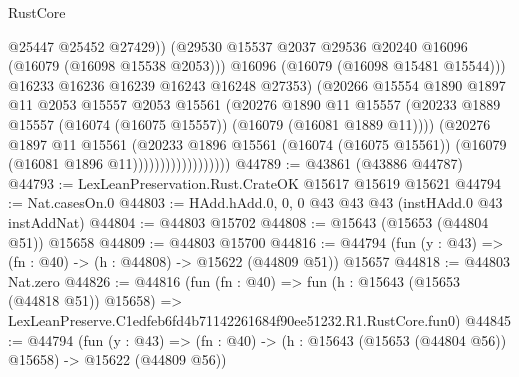 \begin{lexlean}{RustCore}
\begin{coremodule}
                                      @25447
                                      @25452
                                      @27429))
                                  (@29530
                                    @15537
                                    @2037
                                    @29536
                                    @20240
                                    @16096
                                    (@16079 (@16098 @15538 @2053)))
                                  @16096
                                  (@16079 (@16098 @15481 @15544)))
                                @16233
                                @16236
                                @16239
                                @16243
                                @16248
                                @27353)
                              (@20266
                                @15554
                                @1890
                                @1897
                                @11
                                @2053
                                @15557
                                @2053
                                @15561
                                (@20276
                                  @1890
                                  @11
                                  @15557
                                  (@20233
                                    @1889
                                    @15557
                                    (@16074 (@16075 @15557))
                                    (@16079 (@16081 @1889 @11))))
                                (@20276
                                  @1897
                                  @11
                                  @15561
                                  (@20233
                                    @1896
                                    @15561
                                    (@16074 (@16075 @15561))
                                    (@16079 (@16081 @1896 @11))))))))))))))))))
@44789 := @43861 (@43886 @44787)
@44793 := LexLeanPreservation.Rust.CrateOK @15617 @15619 @15621
@44794 := Nat.casesOn.{0}
@44803 := HAdd.hAdd.{0, 0, 0} @43 @43 @43 (instHAdd.{0} @43 instAddNat)
@44804 := @44803 @15702
@44808 := @15643 (@15653 (@44804 @51)) @15658
@44809 := @44803 @15700
@44816 := @44794 (fun (y : @43) => (fn : @40) -> (h : @44808) -> @15622 (@44809 @51)) @15657
@44818 := @44803 Nat.zero
@44826 := @44816
    (fun (fn : @40) =>
    fun (h : @15643 (@15653 (@44818 @51)) @15658) =>
    LexLeanPreserve.C1edfeb6fd4b71142261684f90ee51232.R1.RustCore.fun0)
@44845 := @44794
    (fun (y : @43) =>
    (fn : @40) -> (h : @15643 (@15653 (@44804 @56)) @15658) -> @15622 (@44809 @56))

\end{coremodule}
\end{lexlean}
